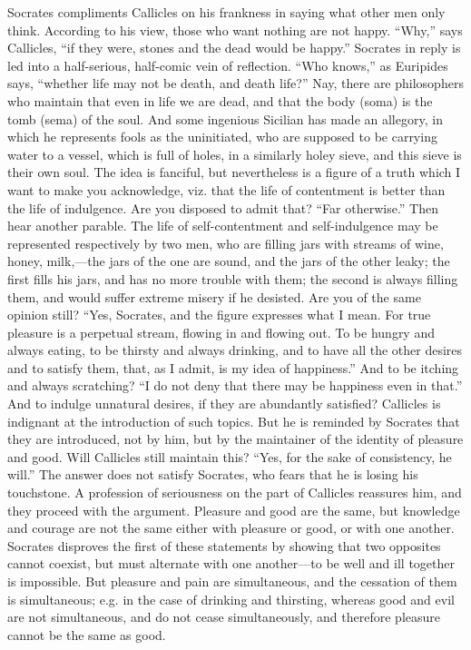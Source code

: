 \documentclass[11pt,letter]{article}
\begin{document}
\par  Socrates compliments Callicles on his frankness in saying what other men only think. According to his view, those who want nothing are not happy. “Why,” says Callicles, “if they were, stones and the dead would be happy.” Socrates in reply is led into a half-serious, half-comic vein of reflection. “Who knows,” as Euripides says, “whether life may not be death, and death life?” Nay, there are philosophers who maintain that even in life we are dead, and that the body (soma) is the tomb (sema) of the soul. And some ingenious Sicilian has made an allegory, in which he represents fools as the uninitiated, who are supposed to be carrying water to a vessel, which is full of holes, in a similarly holey sieve, and this sieve is their own soul. The idea is fanciful, but nevertheless is a figure of a truth which I want to make you acknowledge, viz. that the life of contentment is better than the life of indulgence. Are you disposed to admit that? “Far otherwise.” Then hear another parable. The life of self-contentment and self-indulgence may be represented respectively by two men, who are filling jars with streams of wine, honey, milk,—the jars of the one are sound, and the jars of the other leaky; the first fills his jars, and has no more trouble with them; the second is always filling them, and would suffer extreme misery if he desisted. Are you of the same opinion still? “Yes, Socrates, and the figure expresses what I mean. For true pleasure is a perpetual stream, flowing in and flowing out. To be hungry and always eating, to be thirsty and always drinking, and to have all the other desires and to satisfy them, that, as I admit, is my idea of happiness.” And to be itching and always scratching? “I do not deny that there may be happiness even in that.” And to indulge unnatural desires, if they are abundantly satisfied? Callicles is indignant at the introduction of such topics. But he is reminded by Socrates that they are introduced, not by him, but by the maintainer of the identity of pleasure and good. Will Callicles still maintain this? “Yes, for the sake of consistency, he will.” The answer does not satisfy Socrates, who fears that he is losing his touchstone. A profession of seriousness on the part of Callicles reassures him, and they proceed with the argument. Pleasure and good are the same, but knowledge and courage are not the same either with pleasure or good, or with one another. Socrates disproves the first of these statements by showing that two opposites cannot coexist, but must alternate with one another—to be well and ill together is impossible. But pleasure and pain are simultaneous, and the cessation of them is simultaneous; e.g. in the case of drinking and thirsting, whereas good and evil are not simultaneous, and do not cease simultaneously, and therefore pleasure cannot be the same as good.
\end{document}
